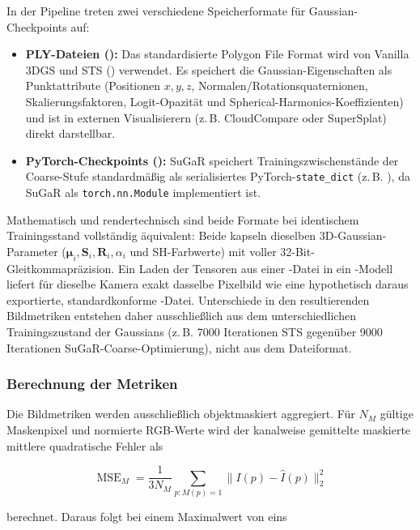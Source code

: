 In der Pipeline treten zwei verschiedene Speicherformate für Gaussian-Checkpoints
auf:
\begin{itemize}
  \item \textbf{PLY-Dateien ():} Das standardisierte Polygon File
        Format wird von Vanilla 3DGS und STS () verwendet. Es
        speichert die Gaussian-Eigenschaften als Punktattribute (Positionen $x,y,z$,
        Normalen/Rotationsquaternionen, Skalierungsfaktoren, Logit-Opazität und
        Spherical-Harmonics-Koeffizienten) und ist in externen Visualisierern (z.\,B.
        CloudCompare oder SuperSplat) direkt darstellbar.
  \item \textbf{PyTorch-Checkpoints ():} SuGaR speichert
        Trainingszwischenstände der Coarse-Stufe standardmäßig als serialisiertes
        PyTorch-\texttt{state\_dict} (z.\,B. ), da SuGaR als
        \texttt{torch.nn.Module} implementiert ist.
\end{itemize}

Mathematisch und rendertechnisch sind beide Formate bei identischem Trainingsstand
vollständig äquivalent: Beide kapseln dieselben 3D-Gaussian-Parameter
($\boldsymbol{\mu}_i, \mathbf{S}_i, \mathbf{R}_i, \alpha_i$ und SH-Farbwerte) mit
voller 32-Bit-Gleitkommapräzision. Ein Laden der Tensoren aus einer -Datei
in ein -Modell liefert für dieselbe Kamera exakt dasselbe Pixelbild wie
eine hypothetisch daraus exportierte, standardkonforme -Datei. Unterschiede
in den resultierenden Bildmetriken entstehen daher ausschließlich aus dem
unterschiedlichen Trainingszustand der Gaussians (z.\,B. 7000 Iterationen STS
gegenüber 9000 Iterationen SuGaR-Coarse-Optimierung), nicht aus dem Dateiformat.

\subsubsection*{Berechnung der Metriken}

Die Bildmetriken werden ausschließlich objektmaskiert aggregiert. Für $N_M$ gültige
Maskenpixel und normierte RGB-Werte wird der kanalweise gemittelte maskierte
mittlere quadratische Fehler als

\begin{equation}
	\operatorname{MSE}_M=
	\frac{1}{3N_M}\sum_{p:M(p)=1}\lVert I(p)-\hat I(p)\rVert_2^2
	\label{eq:masked-mse}
\end{equation}

berechnet. Daraus folgt bei einem Maximalwert von eins

